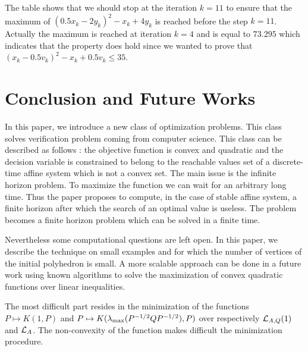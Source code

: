 \documentclass[10pt]{article}
\begin{document}
The table shows that we should stop at the iteration $k=11$ to ensure that the maximum of $(0.5x_k-2 y_k)^2-x_k+4y_k$ is reached before the step $k=11$. Actually the maximum is reached at iteration $k=4$ and is equal to $73.295$ which indicates that the property does hold since we wanted to prove that
$(x_k-0.5 v_k)^2-x_k+0.5 v_k\leq 35$.

\section{Conclusion and Future Works}
\label{conclusion}
In this paper, we introduce a new class of optimization problems. This class solves verification problem coming from computer science. This class can be described as follows : the objective function is convex and quadratic and the decision variable is constrained to belong to the reachable values set of a discrete-time affine system which is not a convex set. The main issue is the infinite horizon problem. To maximize the function we can wait for an arbitrary long time. Thus the paper proposes to compute, in the case of stable affine system, a finite horizon after which the search of an optimal value is useless. The problem becomes a finite horizon problem which can be solved in a finite time. 

Nevertheless some computational questions are left open. In this paper, we describe the technique on small examples and for which the number of vertices of the initial polyhedron is small. A more scalable approach can be done in a future work using known algorithms to solve the maximization of convex quadratic functions over linear inequalities. 

The most  difficult part resides in the minimization of the functions $P\mapsto K(1,P)$ and $P\mapsto K(\lambda_{\operatorname{max}}(P^{-1/2} Q P^{-1/2}),P)$ over respectively $\mathcal{L}_{A,Q}(1)$ and $\mathcal{L}_{A}$. The non-convexity of the function makes difficult the minimization procedure.         

 
\end{document}
